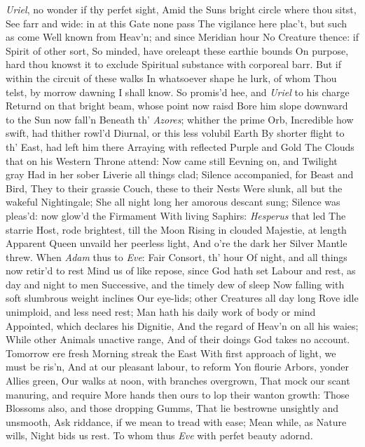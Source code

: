 \documentclass[11pt]{book}
\newcounter {first}
\begin{document}
\textit{Uriel}, no wonder if thy perfet sight, 
Amid the Suns bright circle where thou sitst, 
See farr and wide: in at this Gate none pass 
The vigilance here plac't, but such as come 
Well known from Heav'n; and since Meridian hour 
No Creature thence: if Spirit of other sort, 
So minded, have oreleapt these earthie bounds 
On purpose, hard thou knowst it to exclude 
Spiritual substance with corporeal barr. 
But if within the circuit of these walks 
In whatsoever shape he lurk, of whom 
Thou telst, by morrow dawning I shall know. 
\quad So promis'd hee, and \textit{Uriel} to his charge 
Returnd on that bright beam, whose point now raisd 
Bore him slope downward to the Sun now fall'n 
Beneath th' \textit{Azores}; whither the prime Orb, 
Incredible how swift, had thither rowl'd 
Diurnal, or this less volubil Earth 
By shorter flight to th' East, had left him there 
Arraying with reflected Purple and Gold 
The Clouds that on his Western Throne attend: 
Now came still Eevning on, and Twilight gray 
Had in her sober Liverie all things clad; 
Silence accompanied, for Beast and Bird, 
They to their grassie Couch, these to their Nests 
Were slunk, all but the wakeful Nightingale; 
She all night long her amorous descant sung; 
Silence was pleas'd: now glow'd the Firmament 
With living Saphirs: \textit{Hesperus} that led 
The starrie Host, rode brightest, till the Moon 
Rising in clouded Majestie, at length 
Apparent Queen unvaild her peerless light, 
And o're the dark her Silver Mantle threw. 
\quad When \textit{Adam} thus to \textit{Eve}: Fair Consort, th' hour 
Of night, and all things now retir'd to rest 
Mind us of like repose, since God hath set 
Labour and rest, as day and night to men 
Successive, and the timely dew of sleep 
Now falling with soft slumbrous weight inclines 
Our eye-lids; other Creatures all day long 
Rove idle unimploid, and less need rest; 
Man hath his daily work of body or mind 
Appointed, which declares his Dignitie, 
And the regard of Heav'n on all his waies; 
While other Animals unactive range, 
And of their doings God takes no account. 
Tomorrow ere fresh Morning streak the East 
With first approach of light, we must be ris'n, 
And at our pleasant labour, to reform 
Yon flourie Arbors, yonder Allies green, 
Our walks at noon, with branches overgrown, 
That mock our scant manuring, and require 
More hands then ours to lop their wanton growth: 
Those Blossoms also, and those dropping Gumms, 
That lie bestrowne unsightly and unsmooth, 
Ask riddance, if we mean to tread with ease; 
Mean while, as Nature wills, Night bids us rest. 
\quad To whom thus \textit{Eve} with perfet beauty adornd. 
\end{document}
